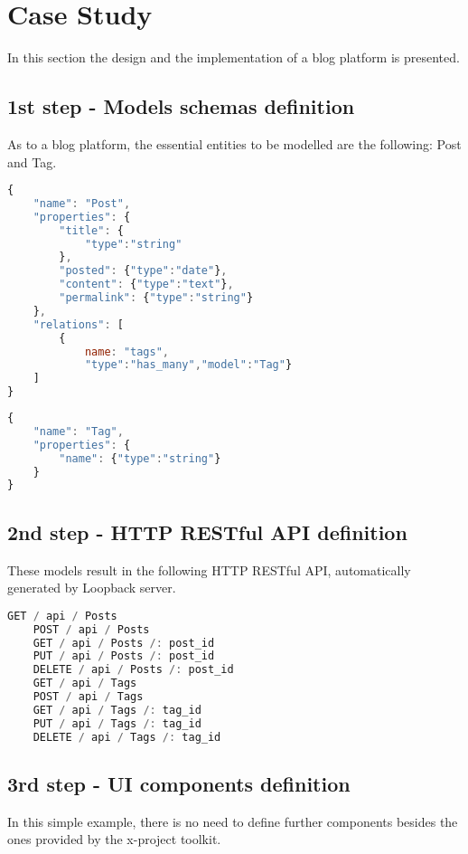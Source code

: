 \section{Case Study}
\label{sec:CAS_castudy}

In this section the design and the implementation of a blog platform is presented.

\subsection{1st step - Models schemas definition}

As to a blog platform, the essential entities to be modelled are the following: Post and Tag.

\begin{lstlisting}[language=javascript]
{
	"name": "Post",
	"properties": {
		"title": {
			"type":"string"
		},
		"posted": {"type":"date"},
		"content": {"type":"text"},
		"permalink": {"type":"string"}
	},
	"relations": [
		{
			name: "tags",
			"type":"has_many","model":"Tag"}
	]
}
\end{lstlisting}

\begin{lstlisting}[language=javascript]
{
	"name": "Tag",
	"properties": {
		"name": {"type":"string"}
	}
}
\end{lstlisting}

\subsection{2nd step - HTTP RESTful API definition}

These models result in the following HTTP RESTful API, automatically generated by Loopback server.

\begin{lstlisting}[language=javascript]
	GET / api / Posts
	POST / api / Posts
	GET / api / Posts /: post_id
	PUT / api / Posts /: post_id
	DELETE / api / Posts /: post_id
	GET / api / Tags
	POST / api / Tags
	GET / api / Tags /: tag_id
	PUT / api / Tags /: tag_id
	DELETE / api / Tags /: tag_id
\end{lstlisting}

\subsection{3rd step - UI components definition}

In this simple example, there is no need to define further components besides the ones provided by the x-project toolkit.

